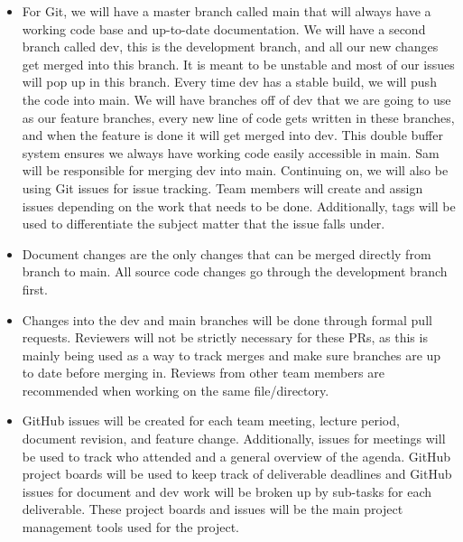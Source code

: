\documentclass{article}
\begin{document}
\begin{itemize}
	\item For Git, we will have a master branch called main that will always have a working code base and up-to-date documentation. We will have a second branch called dev, this is the development branch, and all our new changes get merged into this branch. It is meant to be unstable and most of our issues will pop up in this branch. Every time dev has a stable build, we will push the code into main. We will have branches off of dev that we are going to use as our feature branches, every new line of code gets written in these branches, and when the feature is done it will get merged into dev. This double buffer system ensures we always have working code easily accessible in main. Sam will be responsible for merging dev into main. Continuing on, we will also be using Git issues for issue tracking. Team members will create and assign issues depending on the work that needs to be done. Additionally, tags will be used to differentiate the subject matter that the issue falls under.
 \item Document changes are the only changes that can be merged directly from branch to main. All source code changes go through the development branch first.
    \item Changes into the dev and main branches will be done through formal pull requests. Reviewers will not be strictly necessary for these PRs, as this is mainly being used as a way to track merges and make sure branches are up to date before merging in. Reviews from other team members are recommended when working on the same file/directory. 
	\item GitHub issues will be created for each team meeting, lecture period, document revision, and feature change. Additionally, issues for meetings will be used to track who attended and a general overview of the agenda. GitHub project boards will be used to keep track of deliverable deadlines and GitHub issues for document and dev work will be broken up by sub-tasks for each deliverable. These project boards and issues will be the main project management tools used for the project.
\end{itemize}
\end{document}
